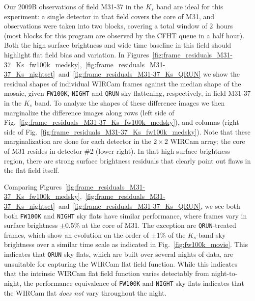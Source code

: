 \documentclass[iop]{emulateapj}
\newcommand{\Fig}[1]{Fig.~\ref{fig:#1}}  %
\begin{document}
Our 2009B observations of field M31-37 in the $K_s$ band are ideal for this experiment: a single detector in that field covers the core of M31, and observations were taken into two blocks, covering a total window of 2~hours (most blocks for this program are observed by the CFHT queue in a half hour).
Both the high surface brightness and wide time baseline in this field should highlight flat field bias and variation.
In Figures~\ref{fig:frame_residuals_M31-37_Ks_fw100k_medsky},~\ref{fig:frame_residuals_M31-37_Ks_nightset}~and~\ref{fig:frame_residuals_M31-37_Ks_QRUN} we show the residual shapes of individual WIRCam frames against the median shape of the mosaic, given \texttt{FW100K}, \texttt{NIGHT} and \texttt{QRUN} sky flattening, respectively, in field M31-37 in the $K_s$ band.
To analyze the shapes of these difference images we then marginalize the difference images along rows (left side of \Fig{frame_residuals_M31-37_Ks_fw100k_medsky}), and columns (right side of \Fig{frame_residuals_M31-37_Ks_fw100k_medsky}).
Note that these marginalization are done for each detector in the $2\times2$ WIRCam array; the core of M31 resides in detector \#2 (lower-right).
In that high surface brightness region, there are strong surface brightness residuals that clearly point out flaws in the flat field itself.

Comparing Figures~\ref{fig:frame_residuals_M31-37_Ks_fw100k_medsky},~\ref{fig:frame_residuals_M31-37_Ks_nightset}~and~\ref{fig:frame_residuals_M31-37_Ks_QRUN}, we see both both \texttt{FW100K} and \texttt{NIGHT} sky flats have similar performance, where frames vary in surface brightness $\pm 0.5\%$ at the core of M31.
The exception are \texttt{QRUN}-treated frames, which show an evolution on the order of $\pm 1\%$ of the $K_s$-band sky brightness over a similar time scale as indicated in \Fig{fw100k_movie}.
This indicates that \texttt{QRUN} sky flats, which are built over several nights of data, are unsuitable for capturing the WIRCam flat field function.
While this indicates that the intrinsic WIRCam flat field function varies detectably from night-to-night, the performance equivalence of \texttt{FW100K} and \texttt{NIGHT} sky flats indicates that the WIRCam flat \emph{does not} vary throughout the night.
\end{document}
